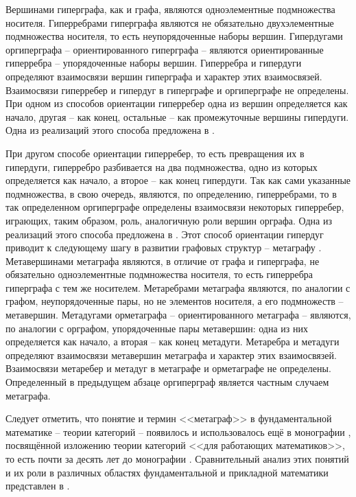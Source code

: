 Вершинами гиперграфа, как и графа, являются одноэлементные подмножества носителя. Гиперребрами гиперграфа являются не обязательно двухэлементные подмножества носителя, то есть неупорядоченные наборы вершин. Гипердугами оргиперграфа -- ориентированного гиперграфа -- являются ориентированные гиперребра -- упорядоченные наборы вершин. Гиперребра и гипердуги определяют взаимосвязи вершин гиперграфа и характер этих взаимосвязей. Взаимосвязи гиперребер и гипердуг в гиперграфе и оргиперграфе не определены. 
При одном из способов ориентации гиперребер одна из вершин определяется как начало, другая -- как конец, остальные -- как промежуточные вершины гипердуги. Одна из реализаций этого способа предложена в \cite{BluminOgrHyperUBS}.

При другом способе ориентации гиперребер, то есть превращения их в гипердуги, гиперребро разбивается на два подмножества, одно из которых определяется как начало, а второе -- как конец гипердуги. Так как сами указанные подмножества, в свою очередь, являются, по определению, гиперребрами, то в так определенном оргиперграфе определены взаимосвязи некоторых гиперребер, играющих, таким образом, роль, аналогичную роли вершин орграфа. Одна из реализаций этого способа предложена в \cite{Gallo}. Этот способ ориентации гипердуг приводит к следующему шагу в развитии графовых структур -- метаграфу \cite{BasuMetagraphs}.
Метавершинами метаграфа являются, в отличие от графа и гиперграфа, не обязательно одноэлементные подмножества носителя, то есть гиперребра гиперграфа с тем же носителем. Метаребрами метаграфа являются, по аналогии с графом, неупорядоченные пары, но не элементов носителя, а его подмножеств -- метавершин. Метадугами орметаграфа -- ориентированного метаграфа -- являются, по аналогии с орграфом, упорядоченные пары метавершин: одна из них определяется как начало, а вторая -- как конец метадуги. Метаребра и метадуги определяют взаимосвязи метавершин метаграфа и характер этих взаимосвязей. Взаимосвязи метаребер и метадуг в метаграфе и орметаграфе не определены. Определенный в предыдущем абзаце оргиперграф является частным случаем метаграфа. 

Следует отметить, что понятие и термин <<метаграф>> в фундаментальной математике -- теории категорий -- появилось и использовалось ещё в монографии \cite{McClein}, посвящённой изложению теории категорий <<для работающих математиков>>, то есть почти за десять лет до монографии \cite{BasuMetagraphs}. Сравнительный анализ этих понятий и их роли в различных областях фундаментальной и прикладной математики представлен в \cite{BluminTheorCategory}.

